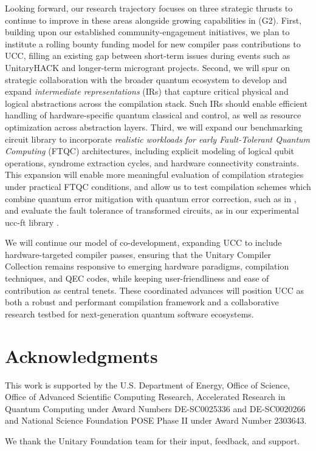 \documentclass[conference]{IEEEtran}
\begin{document}
Looking forward, our research trajectory focuses on three strategic thrusts to continue to improve in these areas alongside growing capabilities in (G2). First, building upon our established community-engagement initiatives, we plan to institute a rolling bounty funding model for new compiler pass contributions to UCC, filling an existing gap between short-term issues during events such as UnitaryHACK and longer-term microgrant projects. Second, we will spur on strategic collaboration with the broader quantum ecosystem to develop and expand \textit{intermediate representations} (IRs) that capture critical physical and logical abstractions across the compilation stack. Such IRs should enable efficient handling of hardware-specific quantum classical and control, as well as resource optimization across abstraction layers. Third, we will expand our benchmarking circuit library to incorporate \textit{realistic workloads for early Fault-Tolerant Quantum Computing} (FTQC) architectures, including explicit modeling of logical qubit operations, syndrome extraction cycles, and hardware connectivity constraints. This expansion will enable more meaningful evaluation of compilation strategies under practical FTQC conditions, and allow us to test compilation schemes which combine quantum error mitigation \cite{qem} with quantum error correction, such as in \cite{Wahl_2023}, and evaluate the fault tolerance of transformed circuits, as in our experimental ucc-ft library \cite{ucc-ft_2025}.

We will continue our model of co-development, expanding UCC to include hardware-targeted compiler passes, ensuring that the Unitary Compiler Collection remains responsive to emerging hardware paradigms, compilation techniques, and QEC codes, while keeping user-friendliness and ease of contribution as central tenets. These coordinated advances will position UCC as both a robust and performant compilation framework and a collaborative research testbed for next-generation quantum software ecosystems.

\section{Acknowledgments}
This work is supported by the U.S. Department of Energy, Office of
Science, Office of Advanced Scientific Computing Research,
Accelerated Research in Quantum Computing under Award
Numbers DE-SC0025336 and DE-SC0020266 and National Science Foundation POSE Phase II under Award Number 2303643.

We thank the Unitary Foundation team for their input, feedback, and support.



\end{document}

